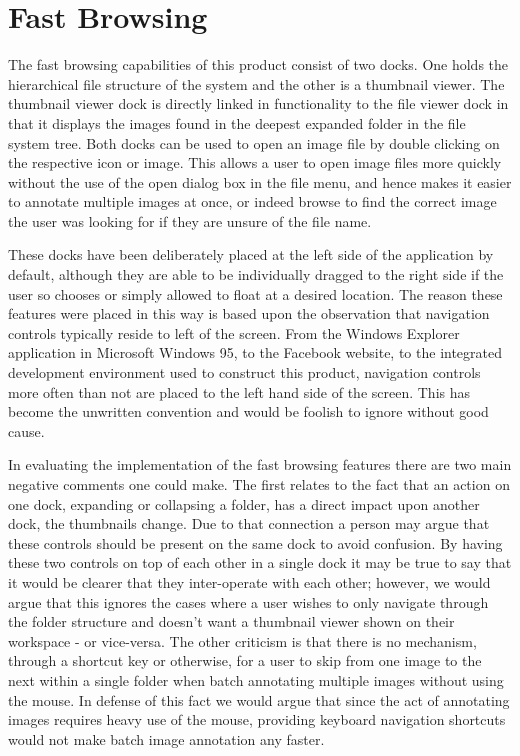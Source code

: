 \section{Fast Browsing}
The fast browsing capabilities of this product consist of two docks.  One holds the hierarchical file structure of the system and the other is a thumbnail viewer.  The thumbnail viewer dock is directly linked in functionality to the file viewer dock in that it displays the images found in the deepest expanded folder in the file system tree.  Both docks can be used to open an image file by double clicking on the respective icon or image.  This allows a user to open image files more quickly without the use of the open dialog box in the file menu, and hence makes it easier to annotate multiple images at once, or indeed browse to find the correct image the user was looking for if they are unsure of the file name.

These docks have been deliberately placed at the left side of the application by default, although they are able to be individually dragged to the right side if the user so chooses or simply allowed to float at a desired location.  The reason these features were placed in this way is based upon the observation that navigation controls typically reside to left of the screen.  From the Windows Explorer application in Microsoft Windows 95, to the Facebook website, to the integrated development environment used to construct this product, navigation controls more often than not are placed to the left hand side of the screen.  This has become the unwritten convention and would be foolish to ignore without good cause.

In evaluating the implementation of the fast browsing features there are two main negative comments one could make.  The first relates to the fact that an action on one dock, expanding or collapsing a folder, has a direct impact upon another dock, the thumbnails change.  Due to that connection a person may argue that these controls should be present on the same dock to avoid confusion.  By having these two controls on top of each other in a single dock it may be true to say that it would be clearer that they inter-operate with each other; however, we would argue that this ignores the cases where a user wishes to only navigate through the folder structure and doesn’t want a thumbnail viewer shown on their workspace - or vice-versa.  The other criticism is that there is no mechanism, through a shortcut key or otherwise, for a user to skip from one image to the next within a single folder when batch annotating multiple images without using the mouse.  In defense of this fact we would argue that since the act of annotating images requires heavy use of the mouse, providing keyboard navigation shortcuts would not make batch image annotation any faster.
